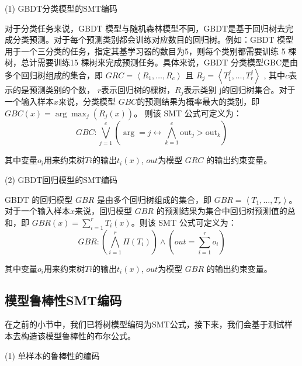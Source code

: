 (1) GBDT分类模型的SMT编码

对于分类任务来说，GBDT 模型与随机森林模型不同，GBDT是基于回归树去完成分类预测。对于每个预测类别都会训练对应数目的回归树。例如：GBDT 模型用于一个三分类的任务，指定其基学习器的数目为5，则每个类别都需要训练 5 棵树，总计需要训练15 棵树来完成预测任务。具体来说，GBDT 分类模型GBC是由多个回归树组成的集合，即 $GRC = \left\langle R_{1}, \ldots, R_{c}\right\rangle$ 且 $R_{j}=\left\langle T_{1}^{j}, \ldots, T_{r}^{j}\right\rangle$ , 其中$c$表示的是预测类别的个数， $r$表示回归树的棵树，$R_j$表示类别 j的回归树集合。对于一个输入样本$x$来说，分类模型 $GBC$的预测结果为概率最大的类别，即$GBC(x)=\arg \max _{j}\left(R_{j}(x)\right)$。 则该 SMT 公式可定义为：
\begin{equation}\label{eq:5}
GBC:\bigvee_{j=1}^{c}\left(\arg =j \leftrightarrow \bigwedge_{k=1}^{c} \text {out}_{j}>\text {out}_{k}\right)
\end{equation}

其中变量$o_i$用来约束树$Ti$的输出$t_i(x)$, $out$为模型 $GRC$ 的输出约束变量。

(2) GBDT回归模型的SMT编码

GBDT 的回归模型 $GBR$ 是由多个回归树组成的集合，即 $GBR=\left\langle T_{1}, \ldots, T_{r}\right\rangle$。 对于一个输入样本$x$来说，回归模型 $GBR$ 的预测结果为集合中回归树预测值的总和，即 $GBR(x)=\sum_{i=1}^{r}T_i(x)$。则该 SMT 公式可定义为：
\begin{equation}\label{eq:6}
GBR:\left(\bigwedge_{i=1}^{r} \Pi\left(T_{i}\right)\right) \wedge \left(out=\sum_{i=1}^{r} o_{i}\right)
\end{equation}

其中变量$o_i$用来约束树$Ti$的输出$t_i(x)$, $out$为模型 $GBR$ 的输出约束变量。
\subsection{模型鲁棒性SMT编码}
在之前的小节中，我们已将树模型编码为SMT公式，接下来，我们会基于测试样本去构造该模型鲁棒性的布尔公式。

(1) 单样本的鲁棒性的编码


